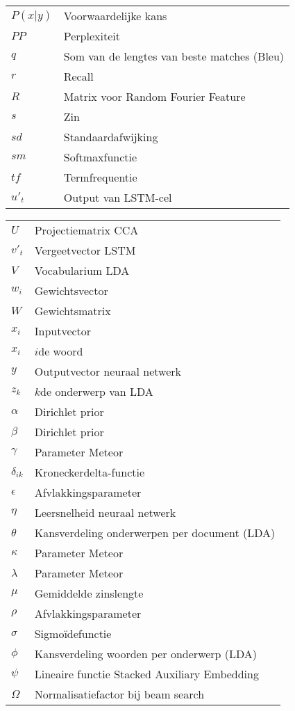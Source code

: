 \documentclass[master=cws,masteroption=ai]{kulemt}
\begin{document}
\begin{flushleft}
\begin{tabularx}{\textwidth}{@{}p{25mm}X@{}}
	$P(x|y) $& Voorwaardelijke kans\\
	$PP$ & Perplexiteit \\
	$q$ & Som van de lengtes van beste matches (Bleu)\\
	$r$& Recall \\
	$R$ & Matrix voor Random Fourier Feature \\
	$s$ & Zin \\
	$sd$ & Standaardafwijking\\
	$sm$ & Softmaxfunctie\\
	$tf$& Termfrequentie \\
	$u'_t$ & Output van LSTM-cel \\


	  \end{tabularx}
	\end{flushleft}
	
\begin{flushleft}
	\renewcommand{\arraystretch}{1.1}
	\begin{tabularx}{\textwidth}{@{}p{25mm}X@{}}
	$U$ &Projectiematrix CCA \\
	$v'_t$& Vergeetvector LSTM \\
	$V$ &Vocabularium LDA \\
	$w_i$ & Gewichtsvector\\
	$W$ & Gewichtsmatrix \\
	$x_i$ & Inputvector\\
	$x_i$ &$i$de woord\\
	$y$ & Outputvector neuraal netwerk\\
	$z_{k}$ & $k$de onderwerp van LDA \\
	$\alpha$ & Dirichlet prior\\
	$\beta$ & Dirichlet prior \\
	$\gamma$ & Parameter Meteor\\
	$\delta_{ik}$ & Kroneckerdelta-functie\\
	$\epsilon$ & Afvlakkingsparameter\\
	$\eta$ & Leersnelheid neuraal netwerk\\
    $\theta$ & Kansverdeling onderwerpen per document (LDA)\\
	$\kappa$ & Parameter Meteor \\
	$\lambda$ & Parameter Meteor \\
	$\mu$ & Gemiddelde zinslengte\\
	$\rho$ & Afvlakkingsparameter\\
	$\sigma$ & Sigmo\"idefunctie \\
	$\phi$ & Kansverdeling woorden per onderwerp (LDA)\\
	$\psi$ & Lineaire functie Stacked Auxiliary Embedding \\
	$\Omega$ & Normalisatiefactor bij beam search \\
		
	\end{tabularx}
\end{flushleft}
\end{document}
